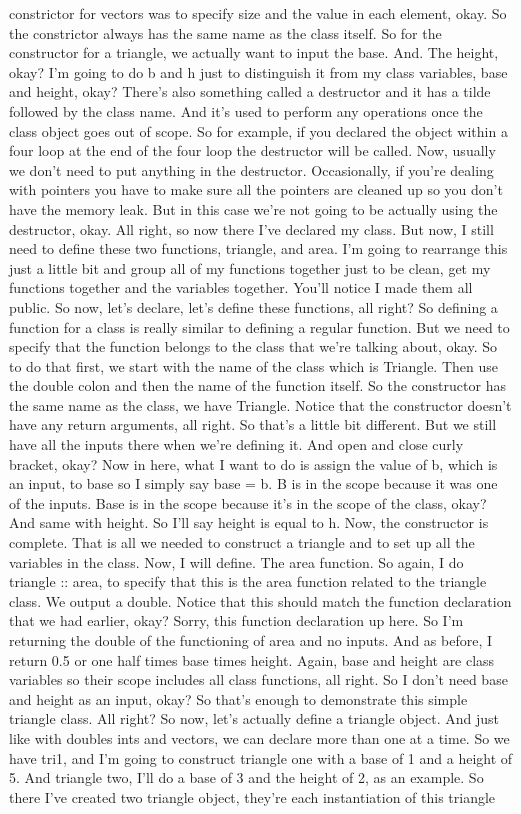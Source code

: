 \documentclass[10pt]{article}
\begin{document}
constrictor for vectors was to specify size and the value in each element, okay. So the constrictor always has the same name as the class itself. So for the constructor for a triangle, we actually want to input the base. And. The height, okay? I'm going to do b and h just to distinguish it from my class variables, base and height, okay? There's also something called a destructor and it has a tilde followed by the class name. And it's used to perform any operations once the class object goes out of scope. So for example, if you declared the object within a four loop at the end of the four loop the destructor will be called. Now, usually we don't need to put anything in the destructor. Occasionally, if you're dealing with pointers you have to make sure all the pointers are cleaned up so you don't have the memory leak. But in this case we're not going to be actually using the destructor, okay. All right, so now there I've declared my class. But now, I still need to define these two functions, triangle, and area. I'm going to rearrange this just a little bit and group all of my functions together just to be clean, get my functions together and the variables together. You'll notice I made them all public. So now, let's declare, let's define these functions, all right? So defining a function for a class is really similar to defining a regular function. But we need to specify that the function belongs to the class that we’re talking about, okay. So to do that first, we start with the name of the class which is Triangle. Then use the double colon and then the name of the function itself. So the constructor has the same name as the class, we have Triangle. Notice that the constructor doesn't have any return arguments, all right. So that's a little bit different. But we still have all the inputs there when we're defining it. And open and close curly bracket, okay? Now in here, what I want to do is assign the value of b, which is an input, to base so I simply say base = b. B is in the scope because it was one of the inputs. Base is in the scope because it's in the scope of the class, okay? And same with height. So I'll say height is equal to h. Now, the constructor is complete. That is all we needed to construct a triangle and to set up all the variables in the class. Now, I will define. The area function. So again, I do triangle :: area, to specify that this is the area function related to the triangle class. We output a double. Notice that this should match the function declaration that we had earlier, okay? Sorry, this function declaration up here. So I'm returning the double of the functioning of area and no inputs. And as before, I return 0.5 or one half times base times height. Again, base and height are class variables so their scope includes all class functions, all right. So I don't need base and height as an input, okay? So that's enough to demonstrate this simple triangle class. All right? So now, let's actually define a triangle object. And just like with doubles ints and vectors, we can declare more than one at a time. So we have tri1, and I'm going to construct triangle one with a base of 1 and a height of 5. And triangle two, I'll do a base of 3 and the height of 2, as an example. So there I've created two triangle object, they're each instantiation of this triangle 
\end{document}
